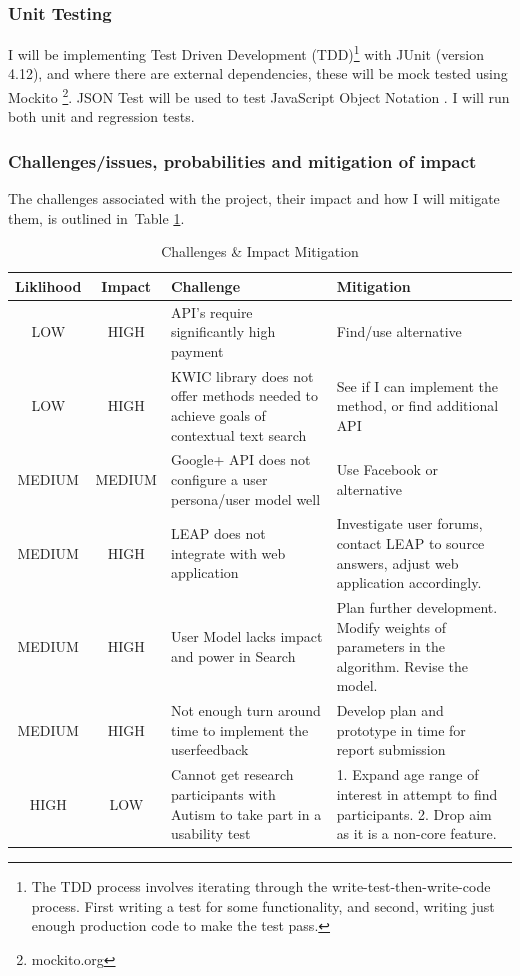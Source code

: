 \documentclass[a4paper, 10pt]{article}
\begin{document}
\subsubsection{Unit Testing}
I will be implementing Test Driven Development (TDD)\footnote{The TDD process involves iterating through the write-test-then-write-code process. First writing a test for some functionality, and second, writing just enough production code to make the test pass.} with JUnit (version 4.12), and where there are external dependencies, these will be mock tested using Mockito \footnote{mockito.org}. JSON Test will be used to test JavaScript Object Notation \cite{jsontest}. I will run both unit and regression tests.

\subsubsection{Challenges/issues, probabilities and mitigation of impact}
The challenges associated with the project, their impact and how I will mitigate them, is outlined in~Table \ref{risks}. 
\begin{table}[H]
\caption{Challenges \& Impact Mitigation} 
\centering
\begin{tabular}{|c | c | p{5cm} | p{5cm} |}
\hline\hline 
Liklihood & Impact & Challenge & Mitigation\\ [0.5ex]
\hline 
LOW & HIGH & API's require significantly high payment & Find/use alternative\\
\hline 
LOW & HIGH & KWIC library does not offer methods needed to achieve goals of contextual text search & See if I can implement the method, or find additional API\\
\hline 
MEDIUM & MEDIUM & Google+ API does not configure a user persona/user model well & Use Facebook or alternative\\
\hline 
MEDIUM & HIGH & LEAP does not integrate with web application & Investigate user forums, contact LEAP to source answers, adjust web application accordingly.\\
\hline
MEDIUM & HIGH & User Model lacks impact and power in Search & Plan further development. Modify weights of parameters in the algorithm. Revise the model. \\
\hline 
MEDIUM & HIGH & Not enough turn around time to implement the userfeedback & Develop plan and prototype in time for report submission\\
\hline
HIGH & LOW & Cannot get research participants with Autism to take part in a usability test & 1. Expand age range of interest in attempt to find participants. 2. Drop aim as it is a non-core feature.\\ 
\hline

\end{tabular}
\label{risks} 
\end{table}
\end{document}
